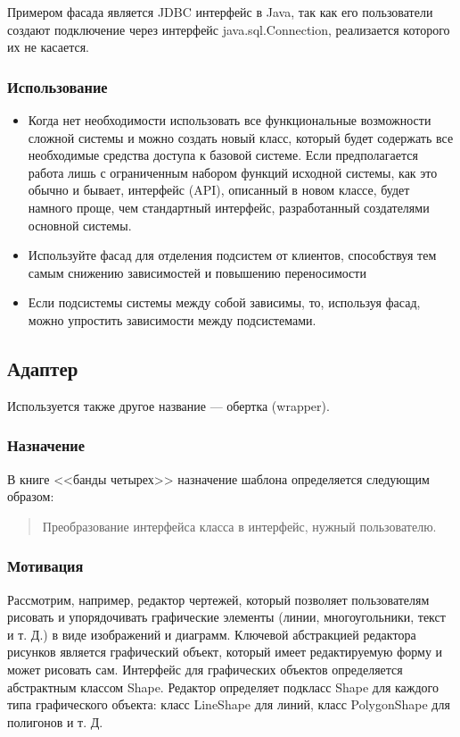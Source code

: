 \documentclass[10pt]{article}
\begin{document}
Примером фасада является JDBC интерфейс в Java, так как его пользователи
создают подключение через интерфейс java.sql.Connection, реализается
которого их не касается.
\subsubsection{Использование}
\begin{itemize}
	\item  Когда нет необходимости использовать все функциональные возможности
сложной системы и можно создать новый класс, который будет содержать все
необходимые средства доступа к базовой системе. Если предполагается работа
лишь с ограниченным набором функций исходной системы, как это обычно и
бывает, интерфейс (API), описанный в новом классе, будет намного проще, чем
стандартный интерфейс, разработанный создателями основной системы.
	\item Используйте фасад для отделения подсистем от клиентов,
	способствуя тем самым снижению зависимостей и повышению переносимости
	\item Если подсистемы системы между собой зависимы, то, используя фасад,
		можно упростить зависимости между подсистемами.
\end{itemize}

\subsection{Адаптер}
Используется также другое название --- обертка (wrapper).
\subsubsection{Назначение}
В книге <<банды четырех>> назначение шаблона определяется
следующим образом:
\begin{quote}
Преобразование интерфейса класса в интерфейс, нужный пользователю.
\end{quote}

\subsubsection{Мотивация}
Рассмотрим, например, редактор чертежей, который позволяет пользователям рисовать и упорядочивать
графические элементы (линии, многоугольники, текст и т. Д.) в виде изображений и диаграмм.
Ключевой абстракцией редактора рисунков является графический объект, который имеет редактируемую
форму и может рисовать сам. Интерфейс для графических объектов определяется абстрактным классом Shape.
Редактор определяет подкласс Shape для каждого типа графического объекта:
класс LineShape для линий, класс PolygonShape для полигонов и т. Д.
\end{document}

